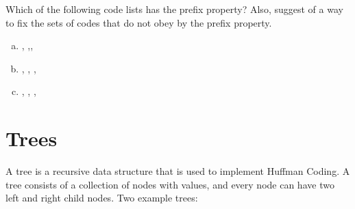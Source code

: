 \begin{Exercise}[label={prefix-prop}]

  Which of the following code lists has the prefix property?  Also,
  suggest of a way to fix the sets of codes that do not obey by the
  prefix property.

  \begin{enumerate}[(a)]
  \item {}, ,,

  \item {}, , , 

  \item {}, , , 

  \end{enumerate}

\end{Exercise}


\newenvironment{huffman}
{\begin{tikzpicture}
    [level distance=10mm,
    hnode/.style={circle,inner sep=1pt,draw=black},
    level 1/.style={sibling distance=20mm},
    level 2/.style={sibling distance=10mm},
    level 3/.style={sibling distance=5mm},
    text height=1.5ex,text depth=.25ex]}{\end{tikzpicture}}

\newenvironment{huffmanc}
{\begin{center}\begin{huffman}}
    {\end{huffman}\end{center}}

\newcommand{\charnodeoffset}{1.0cm}

\newcommand{\nodechar}[2]{\node[below=of #1, yshift=\charnodeoffset] {#2};}

\newcommand{\firstcharnode}[3]{  \node (#1) [hnode] {#2};
  \nodechar{#1}{#3}}

\newcommand{\restcharnode}[4]{
  \node (#1) [hnode,right=of #2] {#3};
  \nodechar{#1}{#4}
}

\section{Trees}

A tree is a recursive data structure that is used to implement Huffman
Coding. A tree consists of a collection of nodes with values, and
every node can have two left and right child
nodes. Two example trees:

